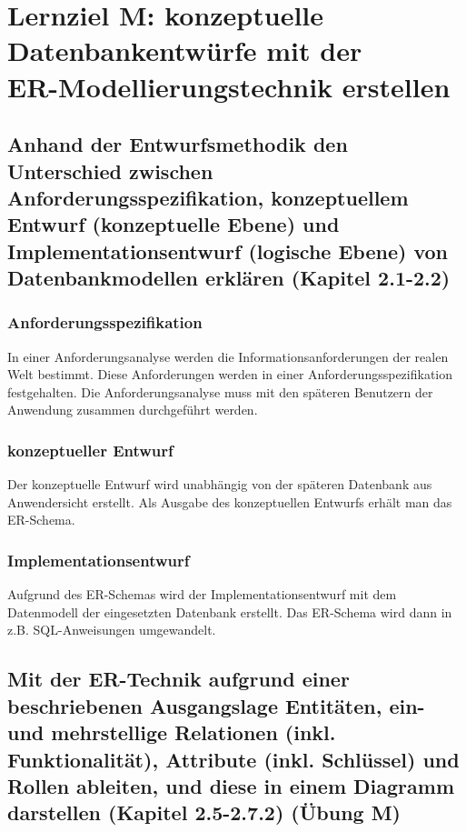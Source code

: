 \section{Lernziel M: konzeptuelle Datenbankentwürfe mit der \\ ER-Modellierungstechnik erstellen}

\subsection{Anhand der Entwurfsmethodik den Unterschied zwischen
Anforderungsspezifikation, konzeptuellem Entwurf (konzeptuelle Ebene)
und Implementationsentwurf (logische Ebene) von Datenbankmodellen
erklären (Kapitel 2.1-2.2)}

\subsubsection{Anforderungsspezifikation}

In einer Anforderungsanalyse werden die Informationsanforderungen der realen Welt bestimmt. Diese Anforderungen werden in einer Anforderungsspezifikation festgehalten. Die Anforderungsanalyse muss mit den späteren Benutzern der Anwendung zusammen durchgeführt werden.

\subsubsection{konzeptueller Entwurf}

Der konzeptuelle Entwurf wird unabhängig von der späteren Datenbank aus Anwendersicht erstellt. Als Ausgabe des konzeptuellen Entwurfs erhält man das ER-Schema.

\subsubsection{Implementationsentwurf}

Aufgrund des ER-Schemas wird der Implementationsentwurf mit dem Datenmodell der eingesetzten Datenbank erstellt. Das ER-Schema wird dann in z.B. SQL-Anweisungen umgewandelt.

\subsection{Mit der ER-Technik aufgrund einer beschriebenen Ausgangslage Entitäten, ein- und mehrstellige Relationen (inkl. Funktionalität), Attribute (inkl. Schlüssel) und Rollen ableiten, und diese in einem Diagramm darstellen (Kapitel 2.5-2.7.2) (Übung M)}

